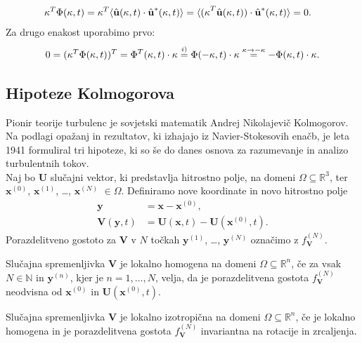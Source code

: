 \documentclass[mat2, tisk]{fmfdelo}
\newcommand{\R}{\mathbb R}
\newcommand{\N}{\mathbb N}
\newcommand{\bd}{\textbf}
\begin{document}
\begin{dokaz}
\begin{enumerate}
\begin{align*}
\text{\bd{$\kappa$}}^T \Phi(\text{\bd{$\kappa$}}, t) &= \text{\bd{$\kappa$}}^T \langle \hat{\bd{u}}(\text{\bd{$\kappa$}}, t) \cdot \hat{\bd{u}}^*(\text{\bd{$\kappa$}}, t) \rangle = \langle \text{(\bd{$\kappa$}}^T \hat{\bd{u}}(\text{\bd{$\kappa$}}, t)) \cdot \hat{\bd{u}}^*(\text{\bd{$\kappa$}}, t) \rangle =  0.
\end{align*}
Za drugo enakost uporabimo prvo:
\begin{align*}
0 = (\text{\bd{$\kappa$}}^T \Phi(\text{\bd{$\kappa$}}, t))^T = \Phi^T(\text{\bd{$\kappa$}}, t) \cdot \text{\bd{$\kappa$}} \stackrel{i)}{=} \Phi(-\text{\bd{$\kappa$}}, t) \cdot \text{\bd{$\kappa$}} \stackrel{\text{\bd{$\kappa$}} \rightarrow - \text{\bd{$\kappa$}}}{=}  -\Phi(\text{\bd{$\kappa$}}, t) \cdot \text{\bd{$\kappa$}}.
\end{align*}
\end{enumerate}
\end{dokaz}

\subsection{Hipoteze Kolmogorova}
Pionir teorije turbulenc je sovjetski matematik Andrej Nikolajevič Kolmogorov. 
Na podlagi opažanj in rezultatov, ki izhajajo iz Navier-Stokesovih enačb, je
leta 1941 formuliral tri hipoteze, ki so še do danes osnova za 
razumevanje in analizo turbulentnih tokov.\\
\noindent
Naj bo $\bd{U}$ slučajni vektor, ki predstavlja hitrostno polje, 
na domeni $\Omega \subseteq \R^3$, ter $\bd{x}^{(0)}$, $\bd{x}^{(1)}$, \dots, $\bd{x}^{(N)}$ $\in \Omega$.
Definiramo nove koordinate in novo hitrostno polje
\begin{align*}
\bd{y} &= \bd{x} - \bd{x}^{(0)}, \\
\bd{V}(\bd{y}, t) &= \bd{U}(\bd{x}, t) - \bd{U}(\bd{x}^{(0)}, t). 
\end{align*}
Porazdelitveno gostoto za $\bd{V}$ v $N$ točkah $\bd{y}^{(1)}$, \dots, $\bd{y}^{(N)}$
označimo z $f_{\bd{V}}^{(N)}$. 

\begin{definicija}
Slučajna spremenljivka $\bd{V}$ je lokalno homogena na domeni 
$\Omega \subseteq \R^n$, če za vsak $N\in \N$ in $\bd{y}^{(n)}$, 
kjer je $n = 1, \dots, N$, velja, da je porazdelitvena gostota 
$f_\bd{V}^{(N)}$ neodvisna od $\bd{x}^{(0)}$ in $\bd{U}(\bd{x}^{(0)}, t)$.
\end{definicija}

\begin{definicija}
Slučajna spremenljivka $\bd{V}$ je lokalno izotropična na domeni 
$\Omega \subseteq \R^n$, če je lokalno homogena in je porazdelitvena 
gostota $f_\bd{V}^{(N)}$ invariantna na rotacije in zrcaljenja.
\end{definicija}
\end{document}

